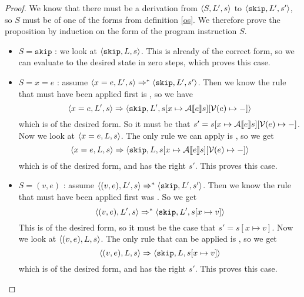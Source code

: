 \begin{proof}
We know that there must be a derivation from $\langle S, L', s \rangle$ to $\langle \texttt{skip}, L', s' \rangle$, so $S$ must be of one of the forms from definition \ref{os}. We therefore prove the proposition by induction on the form of the program instruction $S$.

\begin{itemize}[noitemsep]
    \item $S = \texttt{skip}$ : we look at $\langle \texttt{skip}, L, s \rangle$. This is already of the correct form, so we can evaluate to the desired state in zero steps, which proves this case. 
    
    \item $S = x =  e$ : assume $\langle x = e, L', s \rangle \Rightarrow ^{*} \langle \texttt{skip}, L', s' \rangle$. Then we know the rule that must have been applied first is \asssos, so we have 
    $$\langle x = e, L', s \rangle \Rightarrow \langle \texttt{skip}, L', s[x \mapsto \mathcal{A} \llbracket e \rrbracket s][\mathcal{V}(e)\mapsto-] \rangle$$
    which is of the desired form. So it must be that $s' = s[x \mapsto \mathcal{A} \llbracket e \rrbracket s][\mathcal{V}(e)\mapsto-]$. Now we look at $\langle x = e, L, s \rangle$. The only rule we can apply is \asssos, so we get 
    $$\langle x = e, L, s \rangle \Rightarrow \langle \texttt{skip}, L, s [x \mapsto \mathcal{A} \llbracket e \rrbracket s][\mathcal{V}(e)\mapsto-] \rangle$$
    which is of the desired form, and has the right $s'$. This proves this case. 
    
    \item $S = (v,e)$ : assume $\langle (v,e), L', s \rangle \Rightarrow ^{*} \langle \texttt{skip}, L', s' \rangle$. Then we know the rule that must have been applied first was \setsos. So we get
    $$\langle (v,e), L', s \rangle \Rightarrow ^{*} \langle \texttt{skip}, L', s[x\mapsto v] \rangle$$ 
    This is of the desired form, so it must be the case that $s' = s[x\mapsto v]$. Now we look at $\langle (v,e), L, s \rangle$. The only rule that can be applied is \setsos, so we get $$\langle (v,e), L, s \rangle \Rightarrow  \langle \texttt{skip}, L, s[x\mapsto v] \rangle$$
    which is of the desired form, and has the right $s'$. This proves this case.
    

\end{itemize}
\end{proof}
